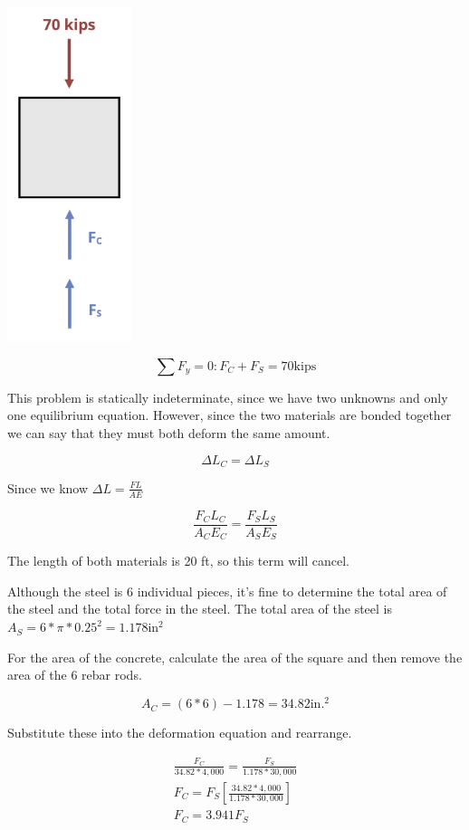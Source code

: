 \documentclass[
  letterpaper,
  DIV=11,
  numbers=noendperiod]{scrreprt}
\begin{document}
\begin{tcolorbox}
\begin{tcolorbox}
\begin{center}
\includegraphics[width=1.42708in,height=\textheight]{images/PNGs/Example 5.7 copy.png}
\end{center}

\[
\sum F_y=0: F_C+F_S=70 \mathrm{kips}
\]

This problem is statically indeterminate, since we have two unknowns and
only one equilibrium equation. However, since the two materials are
bonded together we can say that they must both deform the same amount.

\[
\Delta L_C=\Delta L_S
\]

Since we know \(\Delta L=\frac{F L}{A E}\)

\[
\frac{F_C L_C}{A_C E_C}=\frac{F_S L_S}{A_S E_S}
\]

The length of both materials is 20 ft, so this term will cancel.

Although the steel is 6 individual pieces, it's fine to determine the
total area of the steel and the total force in the steel. The total area
of the steel is \(A_S=6 * \pi * 0.25^2=1.178 \mathrm{in}^2\)

For the area of the concrete, calculate the area of the square and then
remove the area of the 6 rebar rods.

\[
A_C=(6 * 6)-1.178=34.82 \mathrm{in.}^2
\]

Substitute these into the deformation equation and rearrange.

\[
\begin{gathered}
\frac{F_C}{34.82 * 4,000}=\frac{F_S}{1.178 * 30,000} \\
F_C=F_S\left[\frac{34.82 * 4,000}{1.178 * 30,000}\right] \\
F_C=3.941 F_S
\end{gathered}
\]


\end{tcolorbox}
\end{tcolorbox}
\end{document}
